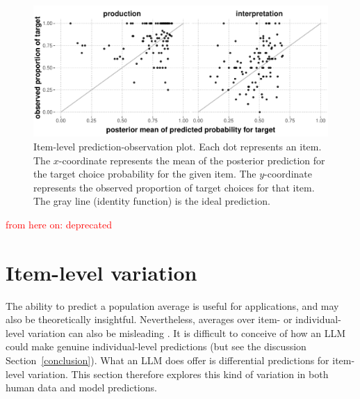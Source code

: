 \documentclass{article}
\begin{document}
\begin{figure}
  \centering

  \includegraphics[width = 0.9\linewidth]{00-pics/item-combined-obs-pred.pdf}

  \caption{
    Item-level prediction-observation plot.
    Each dot represents an item.
    The $x$-coordinate represents the mean of the posterior prediction for the target choice probability for the given item.
    The $y$-coordinate represents the observed proportion of target choices for that item.
    The gray line (identity function) is the ideal prediction.
  }
  \label{fig:item-level-obs-pred}
\end{figure}




\newpage

\textcolor{red}{from here on: deprecated}


\section{Item-level variation}
\label{sec:item-level-variation}

The ability to predict a population average is useful for applications, and may also be theoretically insightful.
Nevertheless, averages over item- or individual-level variation can also be misleading \citep[e.g.,][]{StanovichWest2000:Individual-diff,EstesMaddox2005:Risks-of-Drawin,HaafRouder2019:Some-do-and-som}.
It is difficult to conceive of how an LLM could make genuine individual-level predictions (but see the discussion Section~\ref{conclusion}).
What an LLM does offer is differential predictions for item-level variation.
This section therefore explores this kind of variation in both human data and model predictions.
\end{document}
